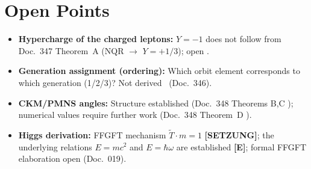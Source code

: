 \section{Open Points}

\begin{itemize}
  \item \textbf{Hypercharge of the charged leptons:} $Y = -1$ does not
    follow from Doc.~347 Theorem~A (NQR $\to$ $Y = +1/3$); open \SM.
  \item \textbf{Generation assignment (ordering):} Which orbit element
    corresponds to which generation (1/2/3)? Not derived \SM\ (Doc.~346).
  \item \textbf{CKM/PMNS angles:} Structure established (Doc.~348 Theorems B,C \BM);
    numerical values require further work (Doc.~348 Theorem~D \SM).
  \item \textbf{Higgs derivation:} FFGFT mechanism $\tilde{T}\cdot m = 1$ \textbf{[SETZUNG]}; the underlying relations $E=mc^2$ and $E=\hbar\omega$ are established \textbf{[E]};
    formal FFGFT elaboration open (Doc.~019).
\end{itemize}
